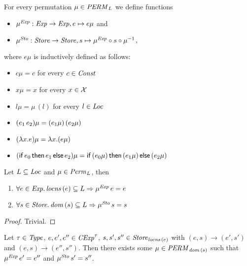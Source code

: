\documentclass[12pt,a4paper]{report}
\newcommand{\CExp}{\nstyle{CExp}}
\newcommand{\Sto}{\nstyle{Sto}}
\newcommand{\PERM}{\nstyle{PERM}}
\begin{document}
For every permutation $\mu \in \PERM_L$ we define functions 
\begin{itemize}
  \item $\mu^{\mathit{Exp}}:\mathit{Exp} \to \mathit{Exp}, e \mapsto e\mu$ and
  \item $\mu^\Sto:\Store \to \Store, s \mapsto \mu^\Exp \circ s \circ \mu^{-1}$,
\end{itemize}
where $e\mu$ is inductively defined as follows:
\begin{itemize}
  \item $c\mu = c$ for every $c \in \mathit{Const}$
  \item $x\mu = x$ for every $x \in \mathcal{X}$
  \item $l\mu = \mu\,(l)$ for every $l \in \mathit{Loc}$
  \item $(e_1\,e_2)\mu = (e_1\mu)\,(e_2\mu)$
  \item $(\lambda x.e)\mu = \lambda x.(e\mu)$
  \item $(\mathsf{if}\,e_0\,\mathsf{then}\,e_1\,\mathsf{else}\,e_2)\mu = \mathsf{if}\,(e_0\mu)\,\mathsf{then}\,(e_1\mu)\,\mathsf{else}\,(e_2\mu)$
\end{itemize}

\begin{corollary}
  Let $L \subseteq \mathit{Loc}$ and $\mu \in \mathit{Perm}_L$, then
  \begin{enumerate}
    \item $\forall e\in\mathit{Exp}.\,\mathit{locns}\,(e) \subseteq L \Rightarrow \mu^{\mathit{Exp}}\,e = e$
    \item $\forall s\in\Store.\,\dom{s} \subseteq L \Rightarrow \mu^\Sto\,s = s$
  \end{enumerate}
\end{corollary}

\begin{proof}
  Trivial.
\end{proof}

\begin{lemma}
  Let $\tau\in\mathit{Type}$, $e,e',e''\in\CExp^\tau$, $s,s',s''\in\mathit{Store}_{\mathit{locns}\,(e)}$ with
  $(e,s) \to (e',s')$ and $(e,s) \to (e'',s'')$. Then there exists some $\mu \in \PERM_{\dom{s}}$
  such that $\mu^{\mathit{Exp}}\,e' = e''$ and $\mu^\Sto\,s' = s''$.
\end{lemma}
\end{document}
